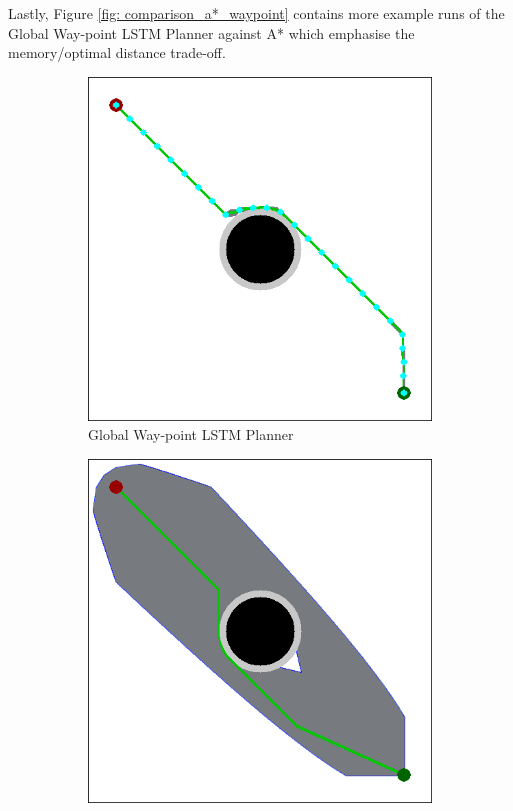 Lastly, Figure \ref{fig: comparison_a*_waypoint} contains more example runs of the Global Way-point LSTM Planner against A* which emphasise the memory/optimal distance trade-off.

\begin{figure}[h]
  \centering
  \begin{subfigure}[b]{0.48\linewidth}
    \includegraphics[width=\linewidth]{images/screenshot_51.png}
    \caption{Global Way-point LSTM Planner}
  \end{subfigure}
  \hfill
  \begin{subfigure}[b]{0.48\linewidth}
    \includegraphics[width=\linewidth]{images/screenshot_44.png}

\end{subfigure}
\end{figure}
